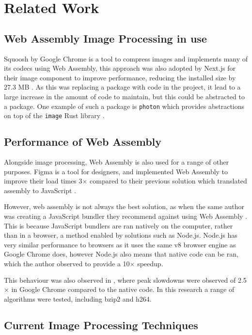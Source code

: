 \documentclass[12pt,a4paper]{article}
\begin{document}
\newpage


\section{Related Work}

\subsection{Web Assembly Image Processing in use}

Squoosh by Google Chrome is a tool to compress images and implements many of its codecs using Web Assembly, this approach was also adopted by Next.js for their image component to improve performance, reducing the installed size by 27.3 MB \cite{nextjs}. As this was replacing a package with code in the project, it lead to a large increase in the amount of code to maintain, but this could be abstracted to a package. One example of such a package is \texttt{photon} which provides abstractions on top of the \texttt{image} Rust library \cite{photon}.

\subsection{Performance of Web Assembly}

Alongside image processing, Web Assembly is also used for a range of other purposes. Figma is a tool for designers, and implemented Web Assembly to improve their load times 3$\times$ compared to their previous solution which translated assembly to JavaScript \cite{figmawasm}.

However, web assembly is not always the best solution, as when the same author was creating a JavaScript bundler they recommend against using Web Assembly \cite{esbuild}. This is because JavaScript bundlers are ran natively on the computer, rather than in a browser, a method enabled by solutions such as Node.js. Node.js has very similar performance to browsers as it uses the same v8 browser engine as Google Chrome does, however Node.js also means that native code can be ran, which the author observed to provide a 10$\times$ speedup.

This behaviour was also observed in \cite{jangda2019not}, where peak slowdowns were observed of 2.5$\times$ in Google Chrome compared to the native code. In this research a range of algorithms were tested, including bzip2 and h264.


\subsection{Current Image Processing Techniques}
\end{document}
